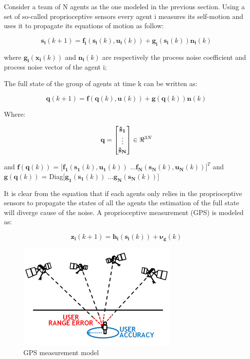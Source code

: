 \documentclass[conference]{IEEEtran}
\begin{document}
Consider a team of N agents as the one modeled in the previous section. Using a set of so-called proprioceptive
sensors every agent i measures its self-motion and uses it to propagate its equations of
motion as follow:

$$  \mathbf{s_{i}}(k+1) =  \mathbf{f_{i}}(\mathbf{s_{i}}(k), \mathbf{u_{i}}(k))+\mathbf{g_{i}}(\mathbf{s_{i}}(k))\mathbf{n_{i}}(k) $$

where $ \mathbf{g_{i}}(\mathbf{x_{i}}(k))$ and $ \mathbf{n_{i}}(k)$ are respectively the process noise coefficient and process noise vector of the agent i;

The full state of the group of agents at time k can be written as:

$$  \mathbf{q}(k+1) =  \mathbf{f}(\mathbf{q}(k), \mathbf{u}(k))+\mathbf{g}(\mathbf{q}(k))\mathbf{n}(k) $$

Where:

$$ \mathbf{q}  = \begin{bmatrix}  \mathbf{\hat{s}_{1}}  \\  \vdots \\  \mathbf{\hat{s}_{N}}  \end{bmatrix} \in \real^{3N} $$

and $\mathbf{f}(\mathbf{q}(k))$ = $[\mathbf{f_{1}}(\mathbf{s_{1}}(k), \mathbf{u_{1}}(k))$ ...$ \mathbf{f_{N}}(\mathbf{s_{N}}(k), \mathbf{u_{N}}(k))]^{T}$ and $\mathbf{g}(\mathbf{q}(k))$ = Diag$[\mathbf{g_{1}}(\mathbf{s_{1}}(k))$ ...$ \mathbf{g_{N}}(\mathbf{s_{N}}(k))]$

It is clear from the equation that if each agents only relies in the proprioceptive sensors to propagate the states of all the agents the estimation of the full state will diverge cause of the noise.
A proprioceptive measurement (GPS) is modeled as:

$$  \mathbf{z_{i}}(k+1) =  \mathbf{h_{i}}(\mathbf{s_{i}}(k))+\mathbf{\nu_{g}}(k) $$

\begin{figure}[H]
 \includegraphics[width=\linewidth]{dwg/gps.jpg}
  \caption{GPS measurement model}
 
\end{figure}
\end{document}
